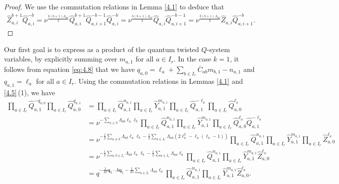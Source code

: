 \documentclass[pdftex]{sigma}
\numberwithin{equation}{section}
\begin{document}
\begin{proof}
We use the commutation relations in Lemma \ref{4.1} to deduce that
\begin{gather*}
\widehat{Z}_{a,i}^{b+1}\widehat{Q}_{a,i}^{-b}
=\nu^{\frac{b(b+1)\Lambda_{aa}}{2}}\widehat{Q}_{a,i}^{b+1}\widehat{Q}_{a,i+1}^{-b-1}\widehat{Q}_{a,i}^{-b}
=\nu^{\frac{b(b+1)\Lambda_{aa}}{2}}\widehat{Q}_{a,i}\widehat{Q}_{a,i+1}^{-b-1}
=\nu^{\frac{b(b+1)\Lambda_{aa}}{2}}\widehat{Z}_{a,i}\widehat{Q}_{a,i+1}^{-b}.\tag*{\qed}
\end{gather*}\renewcommand{\qed}{}
\end{proof}

Our first goal is to express  as a product of the quantum twisted $Q$-system variables, by explicitly summing over $m_{a,1}$ for all $a\in I_r$. In the case $k=1$, it follows from equation \eqref{eq:4.8} that we have $q_{a,0}=\ell_a+\sum_{b\in I_r}\overline{C}_{ab}m_{b,1}-n_{a,1}$ and $q_{a,1}=\ell_a$ for all $a\in I_r$. Using the commutation relations in Lemmas \ref{4.1} and \ref{4.5}\,(1), we have
\begin{align*}
\prod_{a\in I_r}\widehat{Q}_{a,1}^{-q_{a,0}}\prod_{a\in I_r}\widehat{Q}_{a,0}^{q_{a,1}}
&=\prod_{a\in I_r}\widehat{Q}_{a,1}^{n_{a,1}}\prod_{a\in I_r}\widehat{Y}_{a,1}^{m_{a,1}}\prod_{a\in I_r}\widehat{Q}_{a,1}^{-\ell_a}\prod_{a\in I_r}\widehat{Q}_{a,0}^{\ell_a}\\
&=\nu^{-\sum_{a\leq b}\Lambda_{ab}\ell_a\ell_b}\prod_{a\in I_r}\widehat{Q}_{a,1}^{n_{a,1}}\prod_{a\in I_r}\widehat{Y}_{a,1}^{m_{a,1}}\prod_{a\in I_r}\widehat{Q}_{a,0}^{\ell_a}\widehat{Q}_{a,1}^{-\ell_a}\\
&=\nu^{-\frac{1}{2}\sum_{a\neq b}\Lambda_{ab}\ell_a\ell_b-\frac{1}{2}\sum_{a\in I_r}\Lambda_{aa}(2\ell_a^2-\ell_a(\ell_a-1))}\prod_{a\in I_r}\widehat{Q}_{a,1}^{n_{a,1}}\prod_{a\in I_r}\widehat{Y}_{a,1}^{m_{a,1}}\prod_{a\in I_r}\widehat{Z}_{a,0}^{\ell_a}\\
&=\nu^{-\frac{1}{2}\sum_{a,b\in I_r}\Lambda_{ab}\ell_a\ell_b-\frac{1}{2}\sum_{a\in I_r}\Lambda_{aa}\ell_a}\prod_{a\in I_r}\widehat{Q}_{a,1}^{n_{a,1}}\prod_{a\in I_r}\widehat{Y}_{a,1}^{m_{a,1}}\widehat{Z}_{a,0}^{\ell_a}\\
&=q^{-\frac{1}{2\delta}\mathbf{q}_1\cdot\Lambda\mathbf{q}_1-\frac{1}{2\delta}\sum_{a\in I_r}\Lambda_{aa}\ell_a}\prod_{a\in I_r}\widehat{Q}_{a,1}^{n_{a,1}}\prod_{a\in I_r}\widehat{Y}_{a,1}^{m_{a,1}}\widehat{Z}_{a,0}^{\ell_a}.
\end{align*}
\end{document}
